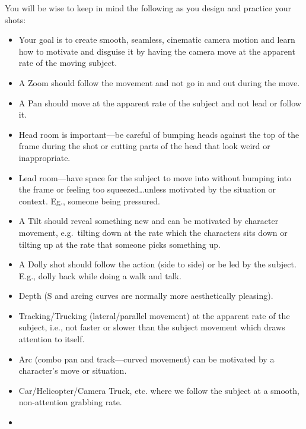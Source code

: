 \documentclass[
]{book}
\providecommand{\tightlist}{%
  \setlength{\itemsep}{0pt}\setlength{\parskip}{0pt}}
\begin{document}
\begin{assessment}
You will be wise to keep in mind the following as you design and practice your
shots:

\begin{itemize}
\tightlist
\item
  Your goal is to create smooth, seamless, cinematic camera motion and learn how to motivate and disguise it by having the camera move at the apparent rate of the moving subject.\\
\item
  A Zoom should follow the movement and not go in and out during the move.\\
\item
  A Pan should move at the apparent rate of the subject and not lead or follow it.\\
\item
  Head room is important---be careful of bumping heads against the top of the frame during the shot or cutting parts of the head that look weird or inappropriate.\\
\item
  Lead room---have space for the subject to move into without bumping into the frame or feeling too squeezed\ldots unless motivated by the situation or context. Eg., someone being pressured.\\
\item
  A Tilt should reveal something new and can be motivated by character movement, e.g.~tilting down at the rate which the characters sits down or tilting up at the rate that someone picks something up.\\
\item
  A Dolly shot should follow the action (side to side) or be led by the subject. E.g., dolly back while doing a walk and talk.\\
\item
  Depth (S and arcing curves are normally more aesthetically pleasing).\\
\item
  Tracking/Trucking (lateral/parallel movement) at the apparent rate of the subject, i.e., not faster or slower than the subject movement which draws attention to itself.
\item
  Arc (combo pan and track---curved movement) can be motivated by a character's move or situation.\\
\item
  Car/Helicopter/Camera Truck, etc. where we follow the subject at a smooth, non-attention grabbing rate.\\
\item

\end{itemize}
\end{assessment}
\end{document}

